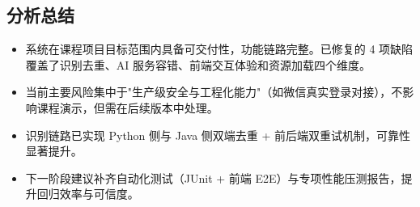 \subsection{分析总结}
\begin{itemize}[leftmargin=2em]
  \item 系统在课程项目目标范围内具备可交付性，功能链路完整。已修复的 4 项缺陷覆盖了识别去重、AI 服务容错、前端交互体验和资源加载四个维度。
  \item 当前主要风险集中于"生产级安全与工程化能力"（如微信真实登录对接），不影响课程演示，但需在后续版本中处理。
  \item 识别链路已实现 Python 侧与 Java 侧双端去重 + 前后端双重试机制，可靠性显著提升。
  \item 下一阶段建议补齐自动化测试（JUnit + 前端 E2E）与专项性能压测报告，提升回归效率与可信度。
\end{itemize}
